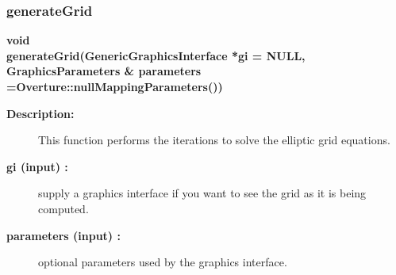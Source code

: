 \subsubsection{generateGrid}
 
\begin{flushleft} \textbf{%
void  \\ 
\settowidth{\EllipticTransformIncludeArgIndent}{generateGrid(}%
generateGrid(GenericGraphicsInterface *gi  = NULL, \\ 
GraphicsParameters \& parameters  =Overture::nullMappingParameters())
}\end{flushleft}
\begin{description}
\item[{\bf Description:}] 
    This function performs the iterations to solve the elliptic grid equations.
\item[{\bf gi (input) :}]  supply a graphics interface if you want to see the grid as it
    is being computed.
\item[{\bf parameters (input) :}]  optional parameters used by the graphics interface.
\end{description}
